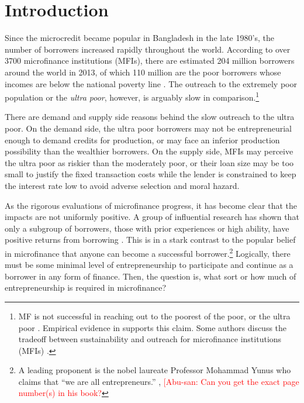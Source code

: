 \section{Introduction}
\label{SecIntroduction}


	Since the microcredit became popular in Bangladesh in the late 1980's, the number of borrowers increased rapidly throughout the world. According to over 3700 microfinance institutions (MFIs), there are estimated 204 million borrowers around the world in 2013, of which 110 million are the poor borrowers whose incomes are below the national poverty line \citep{MFGateway2015}. The outreach to the extremely poor population or the \textit{ultra poor}, however, is arguably slow in comparison.\footnote{MF is not successful in reaching out to the poorest of the poor, or the ultra poor \citep[][]{Scully2004}. Empirical evidence in \citet{Yaron1994, Navajas2000, RahmanRazzaque2000, AghionMorduch2007} supports this claim. Some authors discuss the tradeoff between sustainability and outreach for microfinance institutions (MFIs) \citet{HermesLensink2011, HermesLensinkMeesters2011, Cull2011}. } 

	There are demand and supply side reasons behind the slow outreach to the ultra poor. On the demand side, the ultra poor borrowers may not be entrepreneurial enough to demand credits for production, or may face an inferior production possibility than the wealthier borrowers. On the supply side, MFIs may perceive the ultra poor as riskier than the moderately poor, or their loan size may be too small to justify the fixed transaction costs while the lender is constrained to keep the interest rate low to avoid adverse selection and moral hazard. 

	As the rigorous evaluations of microfinance progress, it has become clear that the impacts are not uniformly positive. A group of influential research has shown that only a subgroup of borrowers, those with prior experiences or high ability, have positive returns from borrowing \citep{Banerjee2015Miracle, Mckenzie2017Spurring, Buera2017, Banerjee2019MFPovertyTrap}. This is in a stark contrast to the popular belief in microfinance that anyone can become a successful borrower.\footnote{A leading proponent is the nobel laureate Professor Mohammad Yunus who claims that ``we are all entrepreneurs.'' \citep{Yunus2003}, \citep{Cosic2017} \textcolor{red}{[Abu-san: Can you get the exact page number(s) in his book?} } Logically, there must be some minimal level of entrepreneurship to participate and continue as a borrower in any form of finance. Then, the question is, what sort or how much of entrepreneurship is required in microfinance? 
	
